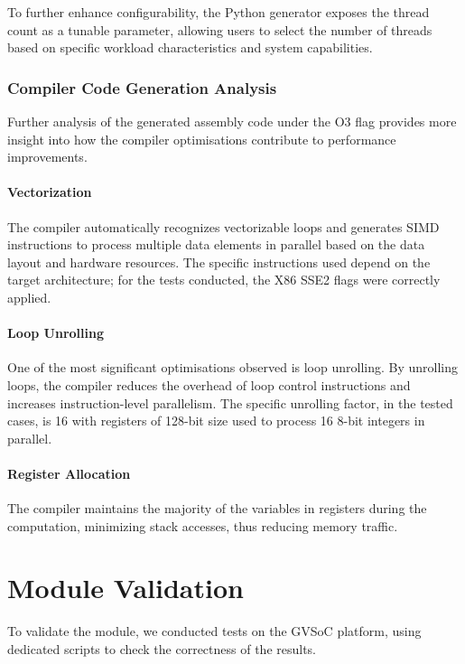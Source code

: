 To further enhance configurability, the Python generator exposes the thread count as a tunable parameter, allowing users to select the number of threads based on specific workload characteristics and system capabilities.

\subsubsection{Compiler Code Generation Analysis}\label{sec:codegen_analysis}
Further analysis of the generated assembly code under the O3 flag provides more insight into how the compiler optimisations contribute to performance improvements.

\paragraph{Vectorization} The compiler automatically recognizes vectorizable loops and generates SIMD instructions to process multiple data elements in parallel based on the data layout and hardware resources.
The specific instructions used depend on the target architecture; for the tests conducted, the X86 SSE2 flags were correctly applied.

\paragraph{Loop Unrolling} One of the most significant optimisations observed is loop unrolling.
By unrolling loops, the compiler reduces the overhead of loop control instructions and increases instruction-level parallelism.
The specific unrolling factor, in the tested cases, is 16 with registers of 128-bit size used to process 16 8-bit integers in parallel.
\paragraph{Register Allocation} The compiler maintains the majority of the variables in registers during the computation, minimizing stack accesses, thus reducing memory traffic.


\section{Module Validation}\label{sec:mod_val}
To validate the module, we conducted tests on the GVSoC platform, using dedicated scripts to check the correctness of the results.

